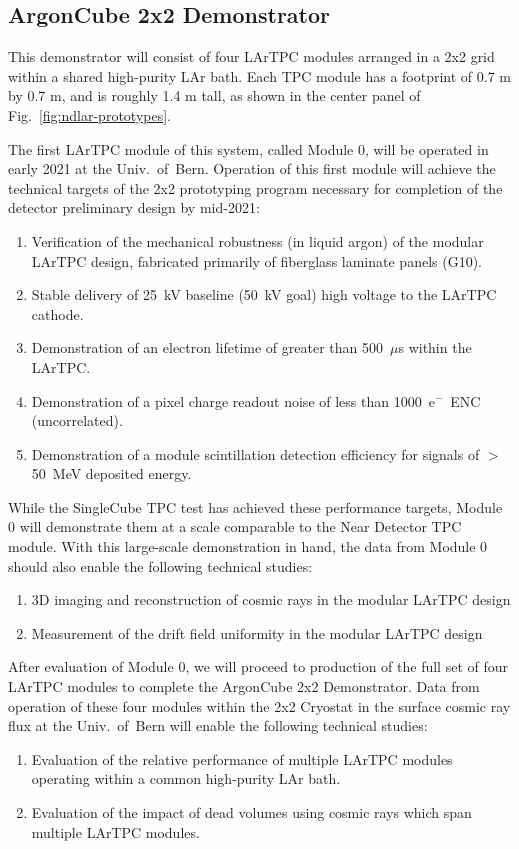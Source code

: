 \subsection{ArgonCube 2x2 Demonstrator}
\label{sec:2x2Demo}

This demonstrator will consist of four LArTPC modules arranged in a 2x2 grid within a shared high-purity LAr bath.
Each TPC module has a footprint of 0.7 m by 0.7 m, and is roughly 1.4 m tall, as shown in the center panel of Fig.~\ref{fig:ndlar-prototypes}.

The first LArTPC module of this system, called Module 0, will be operated in early 2021 at the Univ.~of~Bern.  
Operation of this first module will achieve the technical targets of the 2x2 prototyping program necessary for completion of the detector preliminary design by mid-2021:
\begin{enumerate}
    \item Verification of the mechanical robustness (in liquid argon) of the modular LArTPC design, fabricated primarily of fiberglass laminate panels (G10).
    \item Stable delivery of 25~kV baseline (50~kV goal) high voltage to the LArTPC cathode.
    \item Demonstration of an electron lifetime of greater than 500~$\mu$s within the LArTPC.
    \item Demonstration of a pixel charge readout noise of less than 1000~e$^-$~ENC (uncorrelated).
    \item Demonstration of a module scintillation detection efficiency for signals of $>$50~MeV deposited energy.
\end{enumerate}

While the SingleCube TPC test has achieved these performance targets, Module 0 will demonstrate them at a scale comparable to the Near Detector TPC module.  
With this large-scale demonstration in hand, the data from Module 0 should also enable the following technical studies:
\begin{enumerate}
    \item 3D imaging and reconstruction of cosmic rays in the modular LArTPC design
    \item Measurement of the drift field uniformity in the modular LArTPC design
\end{enumerate}

After evaluation of Module 0, we will proceed to production of the full set of four LArTPC modules to complete the ArgonCube 2x2 Demonstrator.  
Data from operation of these four modules within the 2x2 Cryostat in the surface cosmic ray flux at the Univ.~of~Bern will enable the following technical studies:
\begin{enumerate}
    \item Evaluation of the relative performance of multiple LArTPC modules operating within a common high-purity LAr bath.
    \item Evaluation of the impact of dead volumes using cosmic rays which span multiple LArTPC modules.
\end{enumerate}

